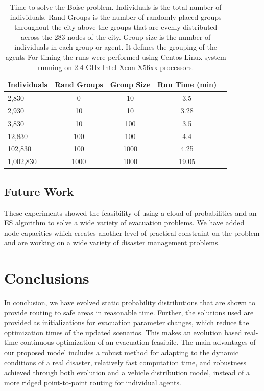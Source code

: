 \documentclass{sig-alternate-05-2015}
\begin{document}
\begin{table}
  \begin{center}
    \caption{Time to solve the Boise problem.  Individuals is the
      total number of individuals.  Rand Groups is the number of
      randomly placed groups throughout the city above the groups that
      are evenly distributed across the 283 nodes of the city.  Group
      size is the number of individuals in each group or agent.  It
      defines the grouping of the agents For timing the runs were
      performed using Centos Linux system running on 2.4 GHz Intel
      Xeon X56xx processors.}
\label{tab:boise}
\begin{tabular}{l*{4}{c}}
  \hline \hline
  Individuals & Rand Groups & Group Size & Run Time (min)  \\
  \hline
2,830     & 0    & 10   & 3.5        \\
2,930     & 10   & 10   & 3.28       \\
3,830     & 10   & 100  & 3.5        \\
12,830    & 100  & 100  & 4.4        \\
102,830   & 100  & 1000 & 4.25       \\
1,002,830 & 1000 & 1000 & 19.05      \\
  \hline
\end{tabular}
  \end{center}
  \end{table}

\subsection{Future Work}

These experiments showed the feasibility of
using a cloud of probabilities and an ES algorithm
to solve a wide variety of evacuation problems.
We have added node capacities which creates another
level of practical constraint on the problem and are
working on a wide variety of disaster management
problems.

\section{Conclusions}

In conclusion, we have evolved static probability distributions that
are shown to provide routing to safe areas in reasonable time.
Further, the solutions used are provided as initializations for
evacuation parameter changes, which reduce the optimization times of
the updated scenarios.  This makes an evolution based real-time
continuous optimization of an evacuation feasibile.  The main
advantages of our proposed model includes a robust method for adapting
to the dynamic conditions of a real disaster, relatively fast
computation time, and robustness achieved through both evolution and a
vehicle distribution model, instead of a more ridged point-to-point
routing for individual agents.
\end{document}
